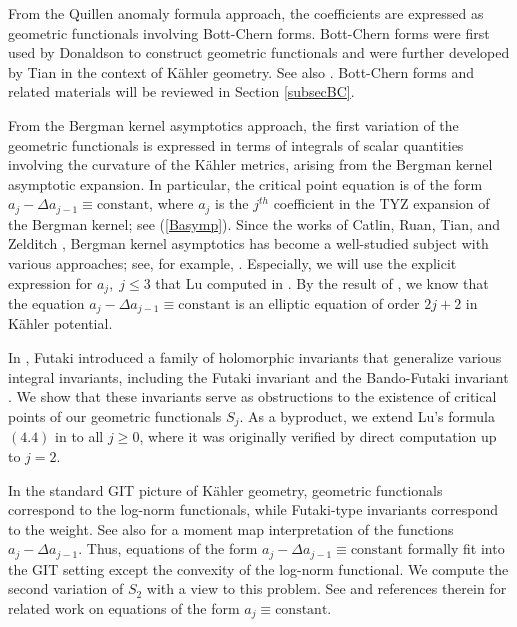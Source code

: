 \documentclass[12pt,reqno,a4paper]{amsart}
\numberwithin{equation}{section}
\theoremstyle{remark}
\theoremstyle{dotless}
\begin{document}
From the Quillen anomaly formula approach, the coefficients are expressed as geometric functionals involving Bott-Chern forms. Bott-Chern forms were first used by Donaldson \cite{donaldson1985anti,donaldson1987infinite} to construct geometric functionals and were further developed by Tian \cite{tian1994k,tian1999bott} in the context of K\"ahler geometry. See also \cite{weinkove2002higher}. Bott-Chern forms and related materials will be reviewed in Section \ref{subsecBC}.

From the Bergman kernel asymptotics approach, the first variation of the geometric functionals is expressed in terms of integrals of scalar quantities involving the curvature of the K\"ahler metrics, arising from the Bergman kernel asymptotic expansion. In particular, the critical point equation is of the form $a_j-\Delta a_{j-1}\equiv \text{constant}$, where $a_j$ is the $j^{th}$ coefficient in the TYZ expansion of the Bergman kernel; see (\ref{Basymp}). Since the works of Catlin, Ruan, Tian, and Zelditch \cite{catlin1999bergman,ruan1996canonical,tian1990set,zelditch1998szego}, Bergman kernel asymptotics has become a well-studied subject with various approaches; see, for example, \cite{dai2006asymptotic,berman2008direct,douglas2010bergman,xu2012closed,hezari2016asymptotic}. Especially, we will use the explicit expression for $a_j, \;j\leq 3$ that Lu computed in \cite{lu2000lower}. By the result of \cite{lu2004log}, we know that the equation $a_j-\Delta a_{j-1}\equiv \text{constant}$ is an elliptic equation of order $2j+2$ in K\"ahler potential. 

In \cite{futaki2004asymptotic}, Futaki introduced a family of holomorphic invariants that generalize various integral invariants, including the Futaki invariant \cite{futaki1983compact} and the Bando-Futaki invariant \cite{bando2006obstruction}. We show that these invariants serve as obstructions to the existence of critical points of our geometric functionals $S_j$. As a byproduct, we extend Lu's formula $(4.4)$ in \cite{lu2004k} to all $j\geq 0$, where it was originally verified by direct computation up to $j=2$.

In the standard GIT picture of K\"ahler geometry, geometric functionals correspond to the log-norm functionals, while Futaki-type invariants correspond to the weight. See also \cite{foth2007manifold,eum2025asymptotic} for a moment map interpretation of the functions $a_j-\Delta a_{j-1}$. Thus, equations of the form $a_j-\Delta a_{j-1}\equiv \text{constant}$ formally fit into the GIT setting except the convexity of the log-norm functional. We compute the second variation of $S_2$ with a view to this problem. See \cite{cristofori2025third} and references therein for related work on equations of the form $a_j\equiv \text{constant}$.
\end{document}
